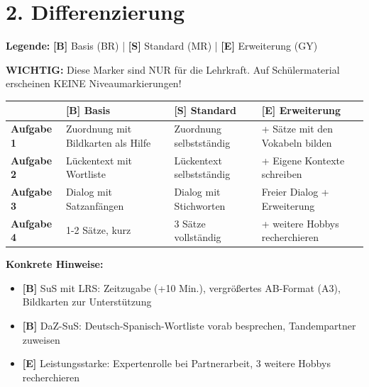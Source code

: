 \documentclass[11pt, a4paper]{article}
\newcommand{\B}{\textcolor{basis}{\textbf{[B]}}}
\newcommand{\Std}{\textcolor{standard}{\textbf{[S]}}}
\newcommand{\E}{\textcolor{erweiterung}{\textbf{[E]}}}
\begin{document}

\section*{2. Differenzierung}

\begin{differenzierung}
\textbf{Legende:} \B{} Basis (BR) | \Std{} Standard (MR) | \E{} Erweiterung (GY)

\vspace{0.5em}

\textbf{WICHTIG:} Diese Marker sind NUR für die Lehrkraft. Auf Schülermaterial erscheinen KEINE Niveaumarkierungen!
\end{differenzierung}

\vspace{1em}

\begin{tabularx}{\textwidth}{|l|X|X|X|}
\hline
& \B{} \textbf{Basis} & \Std{} \textbf{Standard} & \E{} \textbf{Erweiterung} \\
\hline
\textbf{Aufgabe 1} & Zuordnung mit Bildkarten als Hilfe & Zuordnung selbstständig & + Sätze mit den Vokabeln bilden \\
\hline
\textbf{Aufgabe 2} & Lückentext mit Wortliste & Lückentext selbstständig & + Eigene Kontexte schreiben \\
\hline
\textbf{Aufgabe 3} & Dialog mit Satzanfängen & Dialog mit Stichworten & Freier Dialog + Erweiterung \\
\hline
\textbf{Aufgabe 4} & 1-2 Sätze, kurz & 3 Sätze vollständig & + weitere Hobbys recherchieren \\
\hline
\end{tabularx}

\vspace{1em}

\textbf{Konkrete Hinweise:}
\begin{itemize}
    \item \B{} SuS mit LRS: Zeitzugabe (+10 Min.), vergrößertes AB-Format (A3), Bildkarten zur Unterstützung
    \item \B{} DaZ-SuS: Deutsch-Spanisch-Wortliste vorab besprechen, Tandempartner zuweisen
    \item \E{} Leistungsstarke: Expertenrolle bei Partnerarbeit, 3 weitere Hobbys recherchieren
\end{itemize}
\end{document}
